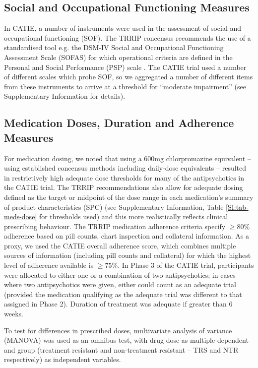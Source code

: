 \documentclass[a4paper,nobib]{article}
\begin{document}
\subsection*{Social and Occupational Functioning Measures}
In CATIE, a number of instruments were used in the assessment of social and occupational functioning (SOF).  The TRRIP concensus recommends the use of a standardised tool e.g. the DSM-IV Social and Occupational Functioning Assessment Scale (SOFAS) for which operational criteria are defined in the Personal and Social Performance (PSP) scale \citep{Morosini2000}.  The CATIE trial used a number of different scales which probe SOF, so we aggregated a number of different items from these instruments to arrive at a threshold for ``moderate impairment'' (see Supplementary Information for details).  

\subsection*{Medication Doses, Duration and Adherence Measures}
For medication dosing, we noted that using a 600mg chlorpromazine equivalent -- using established concensus methods including daily-dose equivalents \citep{Leucht2016} -- resulted in restrictively high adequate dose thresholds for many of the antipsychotics in the CATIE trial.  The TRRIP recommendations also allow for adequate dosing defined as the target or midpoint of the dose range in each medication's summary of product characteristics (SPC) (see Supplementary Information, Table \ref{SI:tab-meds-dose} for thresholds used) and this more realistically reflects clinical prescribing behaviour.  The TRRIP medication adherence criteria specify $\geqslant 80\%$ adherence based on pill counts, chart inspection and collateral information.  As a proxy, we used the CATIE overall adherence score, which combines multiple sources of information (including pill counts and collateral) for which the highest level of adherence available is $\geqslant 75 \%$.  In Phase 3 of the CATIE trial, participants were allocated to either one or a combination of two antipsychotics; in cases where two antipsychotics were given, either could count as an adequate trial (provided the medication qualifying as the adequate trial was different to that assigned in Phase 2).  Duration of treatment was adequate if greater than 6 weeks.

To test for differences in prescribed doses, multivariate analysis of variance (MANOVA) was used as an omnibus test, with drug dose as multiple-dependent and group (treatment resistant and non-treatment resistant -- TRS and NTR respectively) as independent variables.
\end{document}

